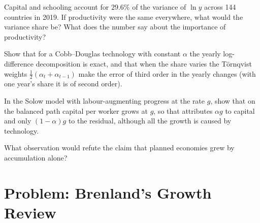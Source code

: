 \begin{exercise}[$\star\star$]\label{exo:b1:growth-accounting:variance}
Capital and schooling account for $29.6\%$ of the variance of $\ln y$ across
144 countries in 2019. %
If productivity were the same everywhere, what would the variance share be?
What does the number say about the importance of productivity?
\end{exercise}

\begin{exercise}[$\star\star\star$]\label{exo:b1:growth-accounting:tornqvist}
Show that for a Cobb--Douglas technology with constant $\alpha$ the yearly
log-difference decomposition is exact, and that when the share varies
the Törnqvist weights $\tfrac12(\alpha_t + \alpha_{t-1})$ make the error of third order
in the yearly changes (with one year's share it is of second order).
\end{exercise}

\begin{exercise}[$\star\star\star$]\label{exo:b1:growth-accounting:induced}
In the Solow model with labour-augmenting progress at the rate $g$, show
that on the balanced path capital per worker grows at $g$, so that  attributes $\alpha g$ to capital and only $(1 - \alpha)g$ to the residual,
although all the growth is caused by technology.
\end{exercise}

\begin{exercise}[$\star\star\star$]\label{exo:b1:growth-accounting:refute}
What observation would refute the claim that planned economies grew by
accumulation alone?
\end{exercise}

\section{Problem: Brenland's Growth Review}\label{sec:b1:growth-accounting:problem}

